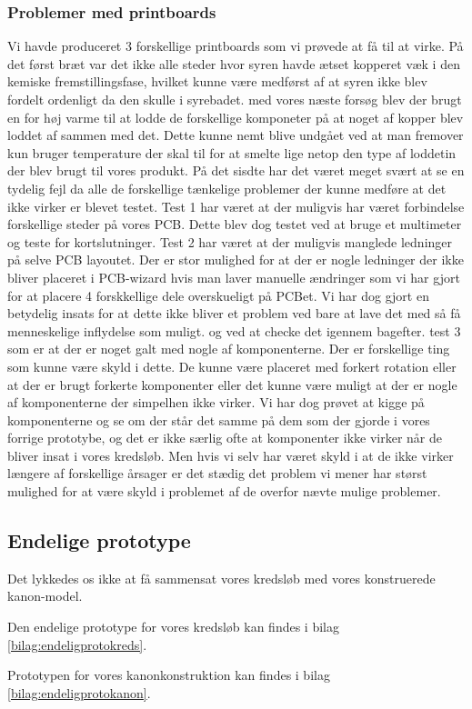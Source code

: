 \subsubsection{Problemer med printboards}
Vi havde produceret 3 forskellige printboards som vi prøvede at få til at virke.
På det først bræt var det ikke alle steder hvor syren havde ætset kopperet væk i den kemiske fremstillingsfase, hvilket kunne være medførst af at syren ikke blev fordelt ordenligt da den skulle i syrebadet.
med vores næste forsøg blev der brugt en for høj varme til at lodde de forskellige komponeter på at noget af kopper blev loddet af sammen med det. Dette kunne nemt blive undgået ved at man fremover kun bruger temperature der skal til for at smelte lige netop den type af loddetin der blev brugt til vores produkt.
På det sisdte har det været meget svært at se en tydelig fejl da alle de forskellige tænkelige problemer der kunne medføre at det ikke virker er blevet testet. 
Test 1 har været at der muligvis har været forbindelse forskellige steder på vores PCB. Dette blev dog testet ved at bruge et multimeter og teste for kortslutninger.
Test 2 har været at der muligvis manglede ledninger på selve PCB layoutet. Der er stor mulighed for at der er nogle ledninger der ikke bliver placeret i PCB-wizard hvis man laver manuelle ændringer som vi har gjort for at placere 4 forskkellige dele overskueligt på PCBet. Vi har dog gjort en betydelig insats for at dette ikke bliver et problem ved bare at lave det med så få menneskelige inflydelse som muligt. og ved at checke det igennem bagefter.
test 3 som er at der er noget galt med nogle af komponenterne. Der er forskellige ting som kunne være skyld i dette. De kunne være placeret med forkert rotation eller at der er brugt forkerte komponenter eller det kunne være muligt at der er nogle af komponenterne der simpelhen ikke virker. Vi har dog prøvet at kigge på komponenterne og se om der står det samme på dem som der gjorde i vores forrige prototybe, og det er ikke særlig ofte at komponenter ikke virker når de bliver insat i vores kredsløb. Men hvis vi selv har været skyld i at de ikke virker længere af forskellige årsager er det stædig det problem vi mener har størst mulighed for at være skyld i problemet af de overfor nævte mulige problemer.

\subsection{Endelige prototype}\label{subs:endeligProto}
Det lykkedes os ikke at få sammensat vores kredsløb med vores konstruerede kanon-model. 

Den endelige prototype for vores kredsløb kan findes i bilag \ref{bilag:endeligprotokreds}.

Prototypen for vores kanonkonstruktion kan findes i bilag \ref{bilag:endeligprotokanon}.


